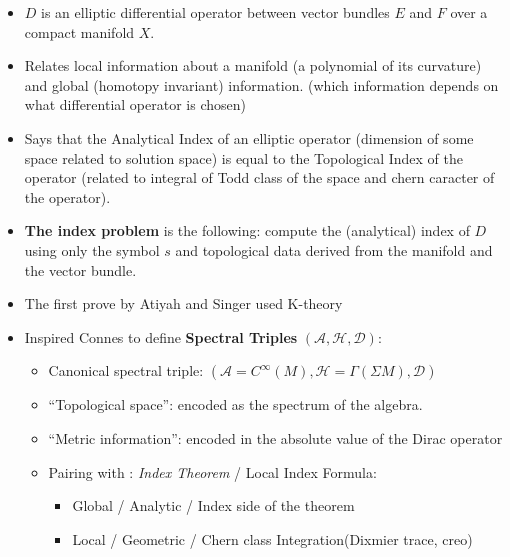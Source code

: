 \documentclass{article}
\begin{document}
\begin{itemize}
    
    \item $D$ is an elliptic differential operator between vector bundles $E$ and $F$ over a compact manifold $X$.
    
    \item Relates local information about a manifold (a polynomial of its curvature) and global (homotopy invariant) information. (which information depends on what differential operator is chosen)
    
    \item Says that the Analytical Index of an elliptic operator (dimension of some space related to solution space) is equal to the Topological Index of the operator (related to integral of Todd class of the space and chern caracter of the operator).
    
    \item \textbf{The index problem} is the following: compute the (analytical) index of $D$ using only the symbol $s$ and topological data derived from the manifold and the vector bundle.
    
    \item The first prove by Atiyah and Singer used K-theory
    
    \item Inspired Connes to define \textbf{Spectral Triples} $(\mathcal A, \mathcal H, \mathcal D)$:
    
        \begin{itemize}
            
        \item Canonical spectral triple: $(\mathcal A = C^\infty(M), \mathcal H = \Gamma(\Sigma M), \mathcal D)$
        
        \item ``Topological space'': encoded as the spectrum of the algebra.
        
        \item ``Metric information'': encoded in the absolute value of the Dirac operator
        
        \item Pairing with : \emph{Index Theorem} / Local Index Formula:
        
            \begin{itemize}
            
            \item Global / Analytic / Index side of the theorem
            \item Local / Geometric / Chern class Integration(Dixmier trace, creo)
            
            \end{itemize}
            
        \end{itemize}
    
\end{itemize}
\end{document}
